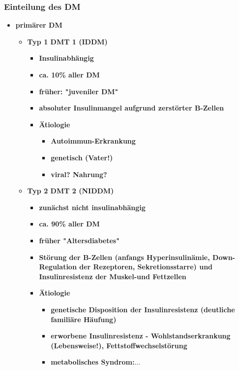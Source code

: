 	\subsubsection{Einteilung des DM}
		\begin{itemize}
			\item \textbf{primärer DM}
				\begin{itemize}
					\item \textbf{Typ 1 DMT 1 (IDDM)}
						\begin{itemize}
							\item \textbf{Insulinabhängig}
							\item \textbf{ca. 10\% aller DM}
							\item \textbf{früher: "juveniler DM"}
							\item \textbf{absoluter Insulinmangel aufgrund zerstörter B-Zellen}
							\item \textbf{Ätiologie}
								\begin{itemize}
									\item \textbf{Autoimmun-Erkrankung}
									\item \textbf{genetisch (Vater!)}
									\item \textbf{viral? Nahrung?}
								\end{itemize}
						\end{itemize}
					\item \textbf{Typ 2 DMT 2 (NIDDM)}
						\begin{itemize}
							\item \textbf{zunächst nicht insulinabhängig}
							\item \textbf{ca. 90\% aller DM}
							\item \textbf{früher "Altersdiabetes"}
							\item \textbf{Störung der B-Zellen (anfangs Hyperinsulinämie, Down-Regulation der Rezeptoren, Sekretionsstarre) und Insulinresistenz der Muskel-und Fettzellen}
							\item \textbf{Ätiologie}
								\begin{itemize}
									\item \textbf{genetische Disposition der Insulinresistenz (deutliche familiäre Häufung)}
									\item \textbf{erworbene Insulinresistenz - Wohlstandserkrankung (Lebensweise!), Fettstoffwechselstörung}
									\item \textbf{metabolisches Syndrom:$\dots$}
								\end{itemize}
						\end{itemize}

\end{itemize}
\end{itemize}
